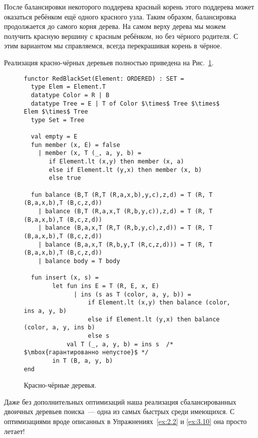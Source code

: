 После балансировки некоторого поддерева красный корень этого поддерева
может оказаться ребёнком ещё одного красного узла. Таким образом,
балансировка продолжается до самого корня дерева. На самом верху
дерева мы можем получить красную вершину с красным ребёнком, но без
чёрного родителя. С этим вариантом мы справляемся, всегда перекрашивая корень
в чёрное.

Реализация красно-чёрных деревьев полностью приведена на Рис.~\ref{fig:3.6}.

\begin{figure}
\begin{lstlisting}
functor RedBlackSet(Element: ORDERED) : SET =
  type Elem = Element.T
  datatype Color = R | B
  datatype Tree = E | T of Color $\times$ Tree $\times$ Elem $\times$ Tree
  type Set = Tree

  val empty = E
  fun member (x, E) = false
    | member (x, T (_, a, y, b) =
       if Element.lt (x,y) then member (x, a)
       else if Element.lt (y,x) then member (x, b)
       else true

  fun balance (B,T (R,T (R,a,x,b),y,c),z,d) = T (R, T (B,a,x,b),T (B,c,z,d))
    | balance (B,T (R,a,x,T (R,b,y,c)),z,d) = T (R, T (B,a,x,b),T (B,c,z,d))
    | balance (B,a,x,T (R,T (R,b,y,c),z,d)) = T (R, T (B,a,x,b),T (B,c,z,d))
    | balance (B,a,x,T (R,b,y,T (R,c,z,d))) = T (R, T (B,a,x,b),T (B,c,z,d))
    | balance body = T body

  fun insert (x, s) =
        let fun ins E = T (R, E, x, E)
              | ins (s as T (color, a, y, b)) =
                  if Element.lt (x,y) then balance (color, ins a, y, b)
                  else if Element.lt (y,x) then balance (color, a, y, ins b)
                  else s
            val T (_, a, y, b) = ins s  /* $\mbox{гарантированно непустое}$ */
        in T (B, a, y, b)
end
\end{lstlisting}

  \caption{Красно-чёрные деревья.}
  \label{fig:3.6}
\end{figure}

\begin{hint}
  Даже без дополнительных оптимизаций наша реализация сбалансированных
  двоичных деревьев поиска~--- одна из самых быстрых среди
  имеющихся. С оптимизациями вроде описанных в
  Упражнениях~\ref{ex:2.2} и \ref{ex:3.10} она просто летает!
\end{hint}

